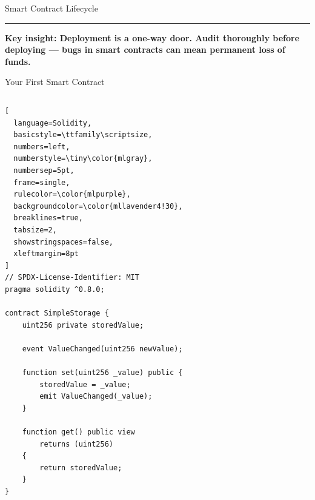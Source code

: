 \documentclass[8pt,aspectratio=169]{beamer}
\newcommand{\bottomnote}[1]{%
\vfill
\vspace{-2mm}
\textcolor{mllavender2}{\rule{\textwidth}{0.4pt}}
\vspace{1mm}
\footnotesize
\textbf{#1}
}
\begin{document}
\begin{frame}{Smart Contract Lifecycle}
\begin{center}
\end{center}

\bottomnote{Key insight: Deployment is a one-way door. Audit thoroughly before deploying --- bugs in smart contracts can mean permanent loss of funds.}
\end{frame}

\begin{frame}[fragile]{Your First Smart Contract}
\vspace{-2mm}
\begin{columns}[T]

\begin{lstlisting}[
  language=Solidity,
  basicstyle=\ttfamily\scriptsize,
  numbers=left,
  numberstyle=\tiny\color{mlgray},
  numbersep=5pt,
  frame=single,
  rulecolor=\color{mlpurple},
  backgroundcolor=\color{mllavender4!30},
  breaklines=true,
  tabsize=2,
  showstringspaces=false,
  xleftmargin=8pt
]
// SPDX-License-Identifier: MIT
pragma solidity ^0.8.0;

contract SimpleStorage {
    uint256 private storedValue;

    event ValueChanged(uint256 newValue);

    function set(uint256 _value) public {
        storedValue = _value;
        emit ValueChanged(_value);
    }

    function get() public view
        returns (uint256)
    {
        return storedValue;
    }
}
\end{lstlisting}

\end{columns}
\end{frame}
\end{document}
